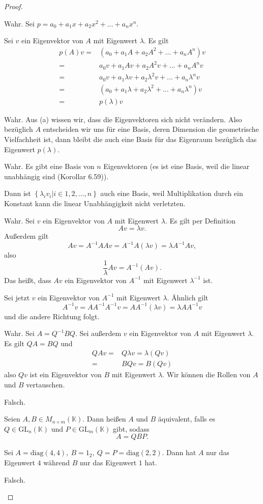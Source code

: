 \begin{proof}
	\begin{parts}
	\item Wahr. Sei $p=a_0+a_1x+a_2x^2+\dots + a_n x^n$. 

		Sei $v$ ein Eigenvektor von $A$ mit Eigenwert $\lambda$. Es gilt
		\begin{align*}
			p(A)v=& \left( a_0+a_1A+a_2 A^2+\dots+a_n A^n \right)v\\
			=&a_0v+a_1Av+a_2A^2v+\dots+a_n A^nv\\
			=&a_0v+a_1\lambda v+a_2\lambda^2 v+\dots+a_n\lambda^n v\\
			=&(a_0+a_1\lambda+a_2\lambda^2+\dots+a_n\lambda^n)v\\
			=&p(\lambda)v
		\end{align*}
	\item Wahr. Aus (a) wissen wir, dass die Eigenvektoren sich nicht verändern. Also bezüglich $A$ entscheiden wir uns f\"{u}r eine Basis, deren Dimension die geometrische Vielfachheit ist, dann bleibt die auch eine Basis f\"{u}r das Eigenraum bezüglich das Eigenwert $p(\lambda)$.
	\item Wahr. Es gibt eine Basis von $n$ Eigenvektoren (es ist eine Basis, weil die linear unabhängig sind (Korollar 6.59)). 

		Dann ist $\left\{ \lambda_i v_i|i\in 1,2,\dots,n \right\} $ auch eine Basis, weil Multiplikation durch ein Konstant kann die linear Unabhängigkeit nicht verletzten.
	\item Wahr. Sei $v$ ein Eigenvektor von $A$ mit Eigenwert $\lambda$. Es gilt per Definition
		\[
		Av=\lambda v
		.\] 
		Außerdem gilt
		\[
			Av=A^{-1}A Av=A^{-1}A(\lambda v)=\lambda A^{-1}Av
		,\] 
		also
		\[
			\frac{1}{\lambda}Av=A^{-1}(Av)
		.\] 
		Das heißt, dass $Av$ ein Eigenvektor von $A^{-1}$ mit Eigenwert $\lambda^{-1}$ ist.

		Sei jetzt $v$ ein Eigenvektor von $A^{-1}$ mit Eigenwert $\lambda$. Ähnlich gilt
		\[
			A^{-1}v=A A^{-1}A^{-1}v=A A^{-1}(\lambda v)=\lambda A A^{-1}v
		\]
		und die andere Richtung folgt.
	\item Wahr. Sei $A=Q^{-1}BQ$. Sei außerdem $v$ ein Eigenvektor von $A$ mit Eigenwert $\lambda$. Es gilt $QA=BQ$ und
		\begin{align*}
			QAv=&Q\lambda v=\lambda(Qv)\\
			=&BQv=B(Qv)
		\end{align*}
		also $Qv$ ist ein Eigenvektor von $B$ mit Eigenwert $\lambda$. Wir können die Rollen von $A$ und $B$ vertauschen. 
	\item Falsch.
		\begin{tcolorbox}[title=Definition]
			Seien $A,B\in M_{n\times m}(\mathbb{K})$. Dann heißen $A$ und $B$ äquivalent, falls es $Q\in\text{GL}_n(\mathbb{K})$ und $P\in \text{GL}_m(\mathbb{K})$ gibt, sodass
			\[
			A=QBP
			.\] 
		\end{tcolorbox}
		Sei $A=\text{diag}(4,4),~B=1_2,~Q=P=\text{diag}(2,2)$. Dann hat $A$ nur das Eigenwert $4$ während $B$ nur das Eigenwert $1$ hat.
	\item Falsch.
	\end{parts}
\end{proof}
